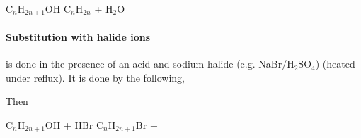 	C$_n$H$_{2n+1}$OH \ch{->[H "$_3$" {} PO  "$_4$" {}][reflux]} C$_n$H$_{2n}$ + H$_2$O
	
	\paragraph{Substitution with halide ions} is done in the presence of an acid and sodium halide (e.g. NaBr/H$_2$SO$_4$) (heated under reflux). It is done by the following,
	
	\begin{center}

		Then		
		
		C$_n$H$_{2n+1}$OH + HBr \ch{->} C$_n$H$_{2n+1}$Br + 
	\end{center}
	
	
